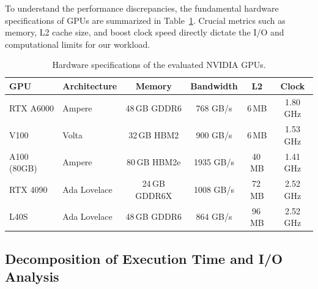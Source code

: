 \documentclass[12pt]{article}
\begin{document}
        To understand the performance discrepancies, the fundamental hardware specifications of GPUs are summarized in Table~\ref{tab:gpu_specs}. Crucial metrics such as memory, L2 cache size, and boost clock speed directly dictate the I/O and computational limits for our workload.

        \begin{table}[htbp]
            \centering
            \caption{Hardware specifications of the evaluated NVIDIA GPUs.}
            \label{tab:gpu_specs}
            \begin{tabular}{llcccc}
                \toprule
                \textbf{GPU} & \textbf{Architecture} & \textbf{Memory} & \textbf{Bandwidth} & \textbf{L2} & \textbf{Clock} \\
                \midrule
                RTX A6000    & Ampere                & 48\,GB GDDR6    & 768 GB/s           & 6\,MB       &       1.80 GHz \\
                V100         & Volta                 & 32\,GB HBM2     & 900 GB/s           & 6\,MB       &       1.53 GHz \\
                A100 (80GB)  & Ampere                & 80\,GB HBM2e    & 1935 GB/s          & 40\,MB      &       1.41 GHz \\
                RTX 4090     & Ada Lovelace          & 24\,GB GDDR6X   & 1008 GB/s          & 72\,MB      &       2.52 GHz \\
                L40S         & Ada Lovelace          & 48\,GB GDDR6    & 864 GB/s           & 96\,MB      &       2.52 GHz \\ 
                \bottomrule
            \end{tabular}
        \end{table}


    \subsection{Decomposition of Execution Time and I/O Analysis}%
    \label{sub:decomposition_of_execution_time_and_i_o_analysis}
\end{document}
